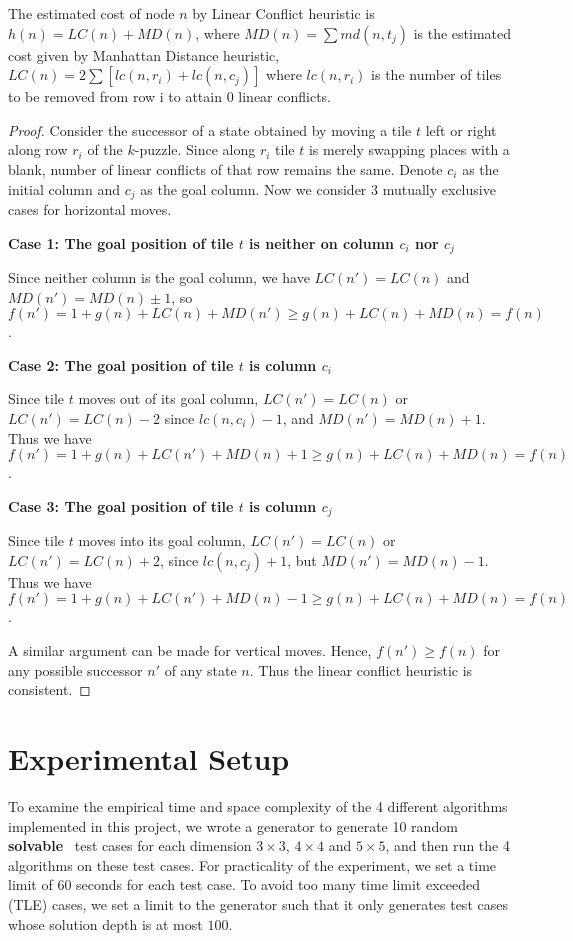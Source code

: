 \documentclass{llncs}
\begin{document}
The estimated cost of node $n$ by Linear Conflict heuristic is $h(n) = LC(n) + MD(n)$, where $MD(n)=\sum md(n,t_j)$ is the estimated cost given by Manhattan Distance heuristic, $LC(n) = 2\sum[lc(n,r_i) +lc(n,c_j)]$ where $lc(n,r_i)$ is the number of tiles to be removed from row i to attain 0 linear conflicts.
\begin{proof}
Consider the successor of a state obtained by moving a tile $t$ left or right along row $r_i$ of the $k$-puzzle. Since along $r_i$ tile $t$ is merely swapping places with a blank, number of linear conflicts of that row remains the same.
Denote $c_i$ as the initial column and $c_j$ as the goal column. Now we consider 3 mutually exclusive cases for horizontal moves.

\textbf{Case 1: The goal position of tile $t$ is neither on column $c_i$ nor $c_j$}

Since neither column is the goal column, we have $LC(n') = LC(n)$ and $MD(n') = MD(n) \pm 1$, so $f(n') = 1 + g(n) + LC(n) + MD(n') \geq g(n) + LC(n) + MD(n) = f(n)$.

\textbf{Case 2: The goal position of tile $t$ is column $c_i$}

Since tile $t$ moves out of its goal column, $LC(n') = LC(n)$ or $LC(n') = LC(n) - 2$ since $lc(n,c_i) - 1$, and $MD(n') = MD(n) + 1$. Thus we have $f(n') = 1 + g(n) + LC(n') + MD(n) + 1 \geq g(n) + LC(n) + MD(n) = f(n)$.

\textbf{Case 3: The goal position of tile $t$ is column $c_j$}

Since tile $t$ moves into its goal column, $LC(n') = LC(n)$ or $LC(n') = LC(n) + 2$, since $lc(n,c_j) + 1$, but $MD(n') = MD(n) - 1$. Thus we have $f(n') = 1 + g(n) + LC(n') + MD(n) - 1 \geq g(n) + LC(n) + MD(n) = f(n)$.

A similar argument can be made for vertical moves. Hence, $f(n') \geq f(n)$ for any possible successor $n'$ of any state $n$. Thus the linear conflict heuristic is consistent.
\end{proof}

\section{Experimental Setup}
To examine the empirical time and space complexity of the 4 different algorithms implemented in this project, we wrote a generator to generate 10 random \textbf{solvable}~\cite{solvable} test cases for each dimension $3 \times 3$, $4 \times 4$ and $5 \times 5$, and then run the 4 algorithms on these test cases. For practicality of the experiment, we set a time limit of $60$ seconds for each test case. To avoid too many time limit exceeded (TLE) cases, we set a limit to the generator such that it only generates test cases whose solution depth is at most $100$.
\end{document}
